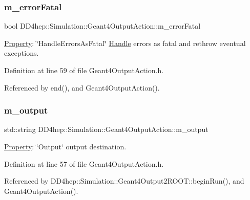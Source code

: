 \subsubsection{\texorpdfstring{m\+\_\+error\+Fatal}{m\_errorFatal}}
{\footnotesize\ttfamily bool D\+D4hep\+::\+Simulation\+::\+Geant4\+Output\+Action\+::m\+\_\+error\+Fatal\hspace{0.3cm}{\ttfamily [protected]}}



\hyperlink{class_d_d4hep_1_1_property}{Property}\+: \char`\"{}\+Handle\+Errors\+As\+Fatal\char`\"{} \hyperlink{class_d_d4hep_1_1_handle}{Handle} errors as fatal and rethrow eventual exceptions. 



Definition at line 59 of file Geant4\+Output\+Action.\+h.



Referenced by end(), and Geant4\+Output\+Action().

\hypertarget{class_d_d4hep_1_1_simulation_1_1_geant4_output_action_ac3bd42351cc01a0e259cb5cc9641c6f4}{}\label{class_d_d4hep_1_1_simulation_1_1_geant4_output_action_ac3bd42351cc01a0e259cb5cc9641c6f4} 
\subsubsection{\texorpdfstring{m\+\_\+output}{m\_output}}
{\footnotesize\ttfamily std\+::string D\+D4hep\+::\+Simulation\+::\+Geant4\+Output\+Action\+::m\+\_\+output\hspace{0.3cm}{\ttfamily [protected]}}



\hyperlink{class_d_d4hep_1_1_property}{Property}\+: \char`\"{}\+Output\char`\"{} output destination. 



Definition at line 57 of file Geant4\+Output\+Action.\+h.



Referenced by D\+D4hep\+::\+Simulation\+::\+Geant4\+Output2\+R\+O\+O\+T\+::begin\+Run(), and Geant4\+Output\+Action().

\hypertarget{class_d_d4hep_1_1_simulation_1_1_geant4_output_action_ac2c6fd898ae2b43b9742cd0fb36d31c1}{}\label{class_d_d4hep_1_1_simulation_1_1_geant4_output_action_ac2c6fd898ae2b43b9742cd0fb36d31c1} 

